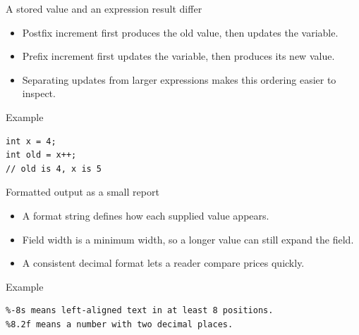 \documentclass[10pt,aspectratio=169]{beamer}
\begin{document}
\begin{frame}[fragile,t]{A stored value and an expression result differ}
\begin{itemize}
\item Postfix increment first produces the old value, then updates the variable.
\item Prefix increment first updates the variable, then produces its new value.
\item Separating updates from larger expressions makes this ordering easier to inspect.
\end{itemize}
\vspace{1mm}\begin{block}{Example}
\begin{lstlisting}
int x = 4;
int old = x++;
// old is 4, x is 5
\end{lstlisting}
\end{block}
\end{frame}

\begin{frame}[fragile,t]{Formatted output as a small report}
\begin{itemize}
\item A format string defines how each supplied value appears.
\item Field width is a minimum width, so a longer value can still expand the field.
\item A consistent decimal format lets a reader compare prices quickly.
\end{itemize}
\vspace{1mm}\begin{block}{Example}
\begin{lstlisting}
%-8s means left-aligned text in at least 8 positions.
%8.2f means a number with two decimal places.
\end{lstlisting}
\end{block}
\end{frame}
\end{document}
